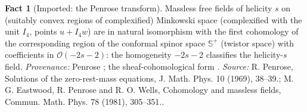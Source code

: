 \documentclass[11pt]{article}
\theoremstyle{definition}
\newtheorem{fact}[theorem]{Fact}
\theoremstyle{plain}
\newcommand{\changedmark}[2]{\marginpar{\raggedright\scriptsize\color{#1}#2}}
\providecommand{\CS}{}\renewcommand{\CS}{{\mathbb{S}^{+}}}
\begin{document}
\begin{fact}[Imported: the Penrose transform]\label{c:hawking.imported-penrose-transform}
\changedmark{gray}{reworded}
Massless free fields of helicity $s$ on (suitably convex regions of complexified) Minkowski space (complexified with the unit $I_4$, points $u + I_4 w$) are in natural isomorphism with the first cohomology of the corresponding region of the conformal spinor space $\CS$ (twistor space) with coefficients in $\mathcal{O}(-2s-2)$: the homogeneity $-2s-2$ classifies the helicity-$s$ field. \emph{Provenance:} Penrose \cite{Penrose1969}; the sheaf-cohomological form \cite{EPW1981}.
\emph{Source:} R. Penrose, Solutions of the zero-rest-mass equations, J. Math. Phys. 10 (1969), 38--39.; M. G. Eastwood, R. Penrose and R. O. Wells, Cohomology and massless fields, Commun. Math. Phys. 78 (1981), 305--351..
\end{fact}
\end{document}
